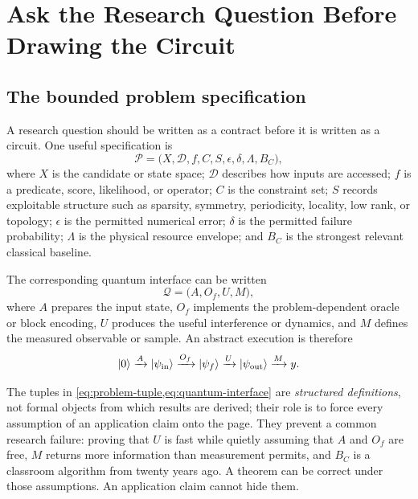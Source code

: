\section{Ask the Research Question Before Drawing the Circuit}\label{sec:contract}

\subsection{The bounded problem specification}

A research question should be written as a contract before it is written as a circuit. One useful specification is
\begin{equation}
\mathcal{P}=\bigl(X,\mathcal{D},f,C,S,\epsilon,\delta,\Lambda,B_C\bigr),
\label{eq:problem-tuple}
\end{equation}
where $X$ is the candidate or state space; $\mathcal{D}$ describes how inputs are accessed; $f$ is a predicate, score, likelihood, or operator; $C$ is the constraint set; $S$ records exploitable structure such as sparsity, symmetry, periodicity, locality, low rank, or topology; $\epsilon$ is the permitted numerical error; $\delta$ is the permitted failure probability; $\Lambda$ is the physical resource envelope; and $B_C$ is the strongest relevant classical baseline.

The corresponding quantum interface can be written
\begin{equation}
\mathcal{Q}=\bigl(A,O_f,U,M\bigr),
\label{eq:quantum-interface}
\end{equation}
where $A$ prepares the input state, $O_f$ implements the problem-dependent oracle or block encoding, $U$ produces the useful interference or dynamics, and $M$ defines the measured observable or sample. An abstract execution is therefore
\begin{equation}
\left|0\right\rangle\xrightarrow{A}\left|\psi_{\mathrm{in}}\right\rangle
\xrightarrow{O_f}\left|\psi_f\right\rangle
\xrightarrow{U}\left|\psi_{\mathrm{out}}\right\rangle
\xrightarrow{M} y.
\label{eq:pipeline}
\end{equation}

The tuples in \cref{eq:problem-tuple,eq:quantum-interface} are \emph{structured definitions}, not formal objects from which results are derived; their role is to force every assumption of an application claim onto the page. They prevent a common research failure: proving that $U$ is fast while quietly assuming that $A$ and $O_f$ are free, $M$ returns more information than measurement permits, and $B_C$ is a classroom algorithm from twenty years ago. A theorem can be correct under those assumptions. An application claim cannot hide them.

